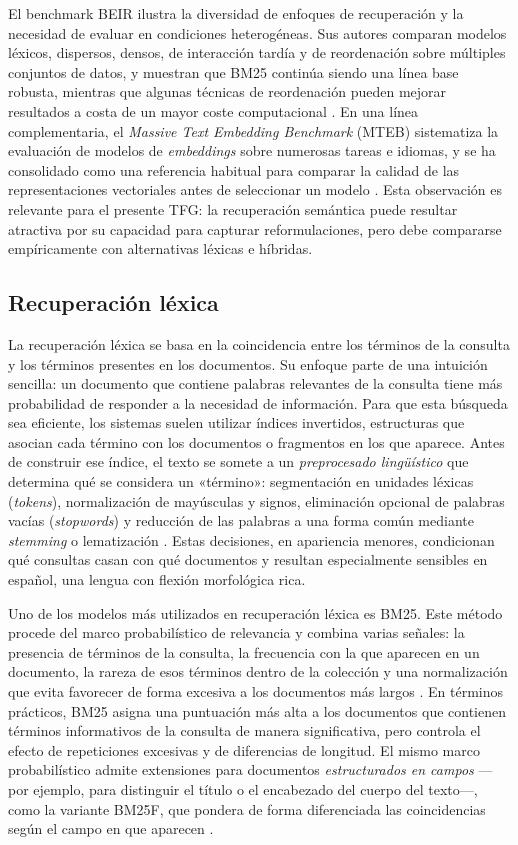 El benchmark BEIR ilustra la diversidad de enfoques de recuperación y la necesidad de evaluar en condiciones heterogéneas. Sus autores comparan modelos léxicos, dispersos, densos, de interacción tardía y de reordenación sobre múltiples conjuntos de datos, y muestran que BM25 continúa siendo una línea base robusta, mientras que algunas técnicas de reordenación pueden mejorar resultados a costa de un mayor coste computacional \cite{thakur2021beir}. En una línea complementaria, el \emph{Massive Text Embedding Benchmark} (MTEB) sistematiza la evaluación de modelos de \emph{embeddings} sobre numerosas tareas e idiomas, y se ha consolidado como una referencia habitual para comparar la calidad de las representaciones vectoriales antes de seleccionar un modelo \cite{muennighoff2023mteb}. Esta observación es relevante para el presente TFG: la recuperación semántica puede resultar atractiva por su capacidad para capturar reformulaciones, pero debe compararse empíricamente con alternativas léxicas e híbridas.

\subsection{Recuperación léxica}
\label{sec:recuperacion-lexica}

La recuperación léxica se basa en la coincidencia entre los términos de la consulta y los términos presentes en los documentos. Su enfoque parte de una intuición sencilla: un documento que contiene palabras relevantes de la consulta tiene más probabilidad de responder a la necesidad de información. Para que esta búsqueda sea eficiente, los sistemas suelen utilizar índices invertidos, estructuras que asocian cada término con los documentos o fragmentos en los que aparece. Antes de construir ese índice, el texto se somete a un \emph{preprocesado lingüístico} que determina qué se considera un «término»: segmentación en unidades léxicas (\emph{tokens}), normalización de mayúsculas y signos, eliminación opcional de palabras vacías (\emph{stopwords}) y reducción de las palabras a una forma común mediante \emph{stemming} o lematización \cite{manning2008ir}. Estas decisiones, en apariencia menores, condicionan qué consultas casan con qué documentos y resultan especialmente sensibles en español, una lengua con flexión morfológica rica.

Uno de los modelos más utilizados en recuperación léxica es BM25. Este método procede del marco probabilístico de relevancia y combina varias señales: la presencia de términos de la consulta, la frecuencia con la que aparecen en un documento, la rareza de esos términos dentro de la colección y una normalización que evita favorecer de forma excesiva a los documentos más largos \cite{robertson2009bm25}. En términos prácticos, BM25 asigna una puntuación más alta a los documentos que contienen términos informativos de la consulta de manera significativa, pero controla el efecto de repeticiones excesivas y de diferencias de longitud. El mismo marco probabilístico admite extensiones para documentos \emph{estructurados en campos} —por ejemplo, para distinguir el título o el encabezado del cuerpo del texto—, como la variante BM25F, que pondera de forma diferenciada las coincidencias según el campo en que aparecen \cite{robertson2009bm25}.


